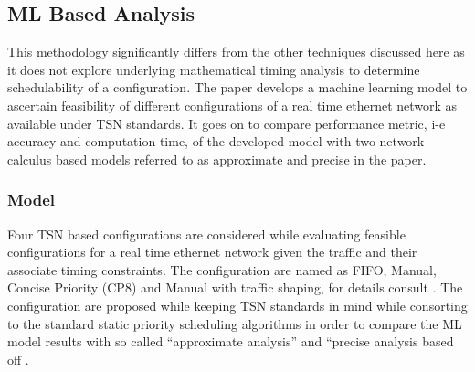\documentclass[journal,12pt,twocolumn]{IEEEtran}
\begin{document}
\subsection {ML Based Analysis}
This methodology significantly differs from the other techniques discussed here as it does not explore underlying mathematical timing analysis to determine schedulability of a configuration. The paper \cite{ML} develops a machine learning model to ascertain feasibility of different configurations of a real time ethernet network as available under TSN standards. It goes on to compare performance metric, i-e accuracy and computation time, of the developed model with two network calculus based models referred to as approximate and precise in the paper.

\subsubsection{Model}
Four TSN based configurations are considered while evaluating feasible configurations for a real time ethernet network given the traffic and their associate timing constraints. The configuration are named as FIFO, Manual, Concise Priority (CP8) and Manual with traffic shaping, for details consult \cite{ML}. The configuration are proposed while keeping TSN standards in mind while consorting to the standard static priority scheduling algorithms in order to compare the ML model results with so called “approximate analysis” and “precise analysis based off  \cite{8,9,37}.
\end{document}
